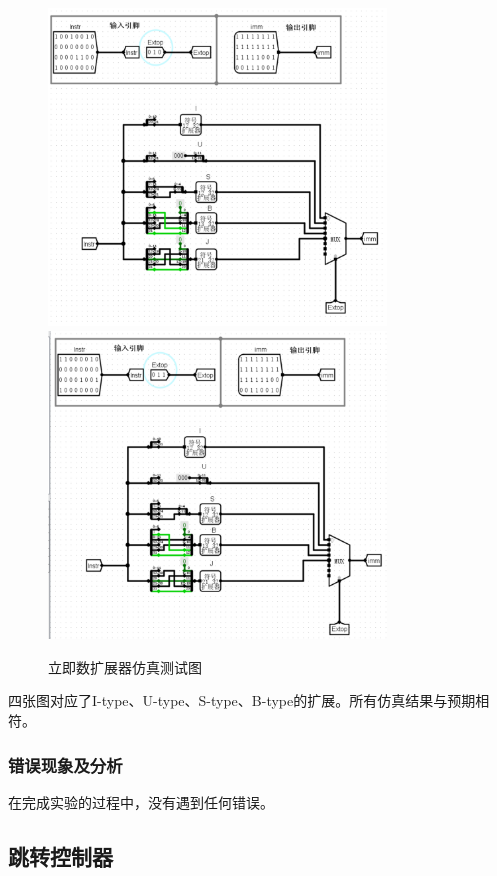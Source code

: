 \documentclass{article}
\begin{document}
    \begin{figure}[H]
        \centering
        \includegraphics[width=0.8\textwidth]{4.5.3.png}
        \includegraphics[width=0.8\textwidth]{4.5.4.png}
        \caption{立即数扩展器仿真测试图}
    \end{figure}
    四张图对应了I-type、U-type、S-type、B-type的扩展。所有仿真结果与预期相符。
    
    \subsubsection{错误现象及分析}
    在完成实验的过程中，没有遇到任何错误。

    \subsection{跳转控制器}
\end{document}
